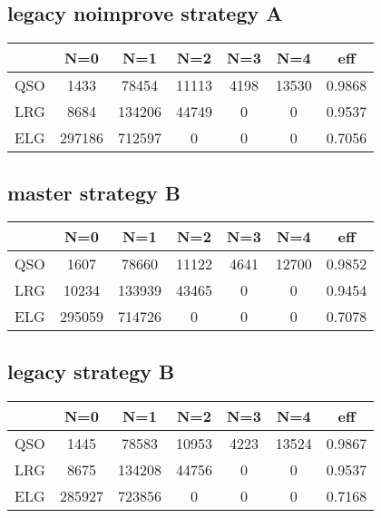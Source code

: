 \documentclass{article}
\begin{document}
\subsection*{legacy noimprove strategy A}
\begin{center}
\begin{tabular}{l|ccccc|c}
 & N=0 & N=1 & N=2 & N=3 & N=4 & eff\\\hline
QSO & 1433 &  78454 &  11113 &  4198 &  13530 &  0.9868\\
LRG & 8684 &  134206 &  44749 &  0 &  0 &  0.9537\\
ELG & 297186 &  712597 &  0 &  0 &  0 &  0.7056\\
\end{tabular}
\end{center}

\subsection*{master strategy B}
\begin{center}
\begin{tabular}{l|ccccc|c}
 & N=0 & N=1 & N=2 & N=3 & N=4 & eff\\\hline
QSO &  1607 &  78660 &  11122 &  4641 &  12700 &  0.9852\\
LRG &  10234 &  133939 &  43465 &  0 &  0 &  0.9454\\
ELG &  295059 &  714726 &  0 &  0 &  0 &  0.7078\\
\end{tabular}
\end{center}

\subsection*{legacy strategy B}
\begin{center}
\begin{tabular}{l|ccccc|c}
 & N=0 & N=1 & N=2 & N=3 & N=4 & eff\\\hline
QSO & 1445 &  78583 &  10953 &  4223 &  13524 &  0.9867\\
LRG & 8675 &  134208 &  44756 &  0 &  0 &  0.9537\\
ELG & 285927 &  723856 &  0 &  0 &  0 &  0.7168\\
\end{tabular}
\end{center}
\end{document}
